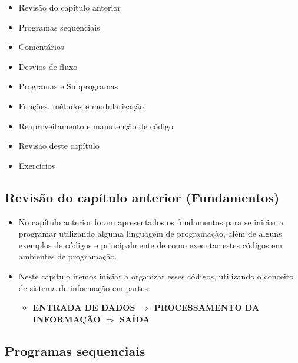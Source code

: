 \documentclass[12pt,a4paper]{article}
\providecommand{\tightlist}{%
      \setlength{\itemsep}{0pt}\setlength{\parskip}{0pt}}
\begin{document}
\begin{itemize}
\tightlist
\item
  Revisão do capítulo anterior
\item
  Programas sequenciais
\item
  Comentários
\item
  Desvios de fluxo
\item
  Programas e Subprogramas
\item
  Funções, métodos e modularização
\item
  Reaproveitamento e manutenção de código
\item
  Revisão deste capítulo
\item
  Exercícios
\end{itemize}

    \hypertarget{revisuxe3o-do-capuxedtulo-anterior-fundamentos}{%
\subsection{Revisão do capítulo anterior
(Fundamentos)}\label{revisuxe3o-do-capuxedtulo-anterior-fundamentos}}

    \begin{itemize}
\item
  No capítulo anterior foram apresentados os fundamentos para se iniciar
  a programar utilizando alguma linguagem de programação, além de alguns
  exemplos de códigos e principalmente de como executar estes códigos em
  ambientes de programação.
\item
  Neste capítulo iremos iniciar a organizar esses códigos, utilizando o
  conceito de sistema de informação em partes:

  \begin{itemize}
  \tightlist
  \item
    \textbf{ENTRADA DE DADOS \(\Rightarrow\) PROCESSAMENTO DA INFORMAÇÃO
    \(\Rightarrow\) SAÍDA}
  \end{itemize}
\end{itemize}

    \hypertarget{programas-sequenciais}{%
\subsection{Programas sequenciais}\label{programas-sequenciais}}
\end{document}

